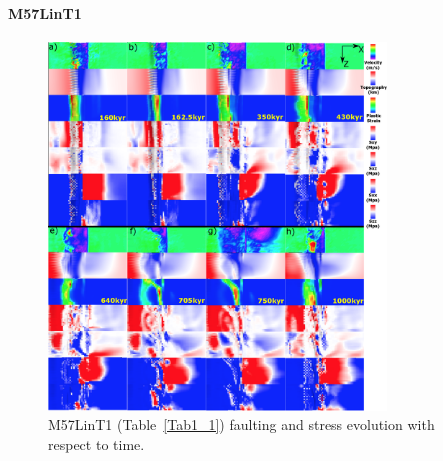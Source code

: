 \paragraph{M57LinT1}\label{para_M57LinT1}

\begin{figure}[h]
 \centering
  \includegraphics[width=0.8\textwidth]{fig_Results_MRange_2_M57LinT1_time_evolution.eps}
 \caption{M57LinT1 (Table~\hyperref[Tab1_1]{\ref{Tab1_1}}) faulting and stress evolution with respect to time.}
\label{fig_Results_MRange_2}
\end{figure}

